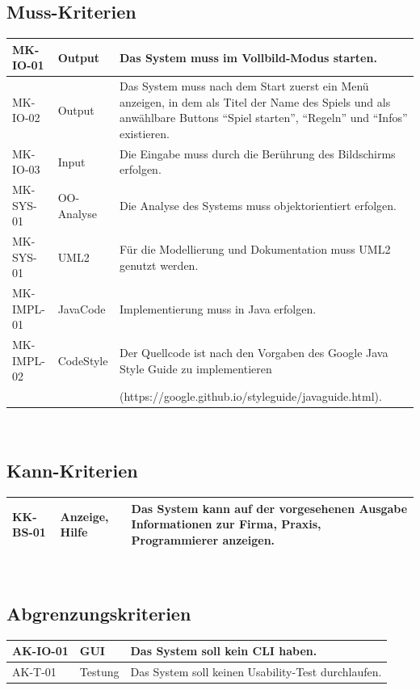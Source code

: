 \documentclass[12pt]{article}
\begin{document}
\subsection{Muss-Kriterien}
\begin{tabularx}{\textwidth}{|l|l|X|} \hline
MK-IO-01&Output&Das System muss im Vollbild-Modus starten.\\ \hline
MK-IO-02&Output&Das System muss nach dem Start zuerst ein Menü anzeigen, in dem als Titel der Name des Spiels und als anwählbare \Glspl{Button} "`Spiel starten"', "`Regeln"' und "`Infos"' existieren.\\ \hline
MK-IO-03&Input &Die Eingabe muss durch die Berührung des Bildschirms erfolgen.\\ \hline
MK-SYS-01&OO-Analyse&Die Analyse des Systems muss objektorientiert erfolgen.\\ \hline
MK-SYS-01&UML2&Für die Modellierung und Dokumentation muss UML2 genutzt werden.\\ \hline
MK-IMPL-01&JavaCode&Implementierung muss in Java erfolgen.\\ \hline
MK-IMPL-02&CodeStyle&Der Quellcode ist nach den Vorgaben des Google Java Style Guide zu implementieren\\&&(https://google.github.io/styleguide/javaguide.html).\\ \hline
\end{tabularx}\\

\subsection{Kann-Kriterien}
\begin{tabularx}{\textwidth}{|l|l|X|} \hline
KK-BS-01&Anzeige, Hilfe&Das System kann auf der vorgesehenen Ausgabe Informationen zur Firma, Praxis, Programmierer anzeigen.\\ \hline
\end{tabularx}\\

\subsection{Abgrenzungskriterien}
\begin{tabularx}{\textwidth}{|l|l|X|} \hline
AK-IO-01&GUI&Das System soll kein \Gls{CLI} haben.\\ \hline
AK-T-01&Testung&Das System soll keinen Usability-Test durchlaufen.\\ \hline
\end{tabularx}\\
\end{document}
